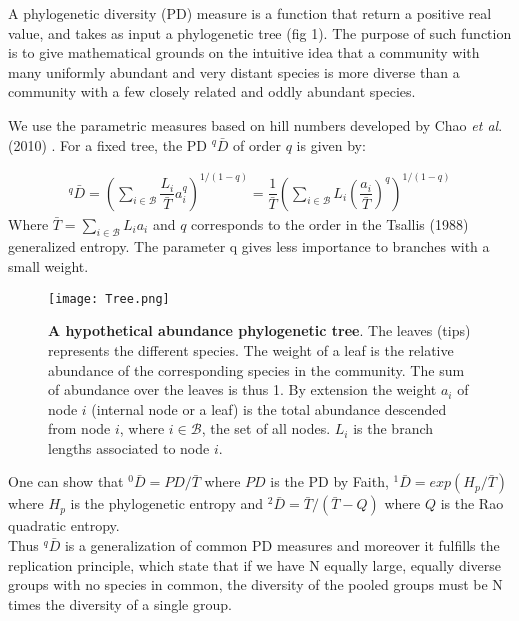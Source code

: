 \documentclass{article}
\begin{document}
A phylogenetic diversity (PD) measure is a function that return a positive real value, and takes as input a phylogenetic tree (fig 1).
The purpose of such function is to give mathematical grounds on the intuitive idea that a community with many uniformly abundant and very distant species is more diverse than a community with a few closely related and oddly abundant species.
 

We use the parametric measures based on hill numbers developed by Chao \textit{et al}. (2010) \cite{Chao2010}.   
For a fixed tree, the PD $ ^q \bar{D} $ of order $q$ is given by:


\begin{align}
 ^q \bar{D}  
 =\left( \sum_{i \in \mathcal{B}} \dfrac{L_i}{\bar{T}} a_i^q  \right)^{1/(1-q)}
 = \dfrac{1}{\bar{T}}\left( \sum_{i \in \mathcal{B}} L_i \left( \dfrac{a_i}{ \bar{T}} \right)^q  \right)^{1/(1-q)}
 \end{align}
Where $\displaystyle \bar{T} =\sum_{i \in \mathcal{B}} L_i a_i$ and $q$ corresponds to the order in the Tsallis (1988) generalized entropy.
The parameter q gives less importance to branches with a small weight. \\
 
\begin{figure}[H]
	  \centering
       \texttt{[image: Tree.png]}\\
		\caption{ \textbf{A hypothetical abundance phylogenetic tree}. 
		\label{fig:phylo}
		The leaves (tips) represents the different species. 
		The weight of a leaf is the relative abundance of the corresponding species in the community. 
		The sum of abundance over the leaves is thus 1. 
		By extension the weight $a_i$ of node  $i$ (internal node or a leaf) is the total abundance descended from node $i$, where $i \in \mathcal{B}$, the set of all nodes. 
		$L_i$ is the branch lengths associated to node $i$.}
	\end{figure}
	
One can show that  $^0 \bar{D} =PD/\bar{T}$ where $PD$ is the PD by Faith, $^1 \bar{D} =exp(H_p/ \bar{T})$ where $H_p$ is the phylogenetic entropy and $^2 \bar{D} =\bar{T}/(\bar{T}-Q)$ where $Q$ is the Rao quadratic entropy. \\
Thus $^q \bar{D} $ is a generalization of common PD measures and moreover it fulfills the replication principle, which state that if we have N equally large, equally diverse groups with no species in common, the diversity of the pooled groups must be N times the diversity of a single group. \\
 
\end{document}
